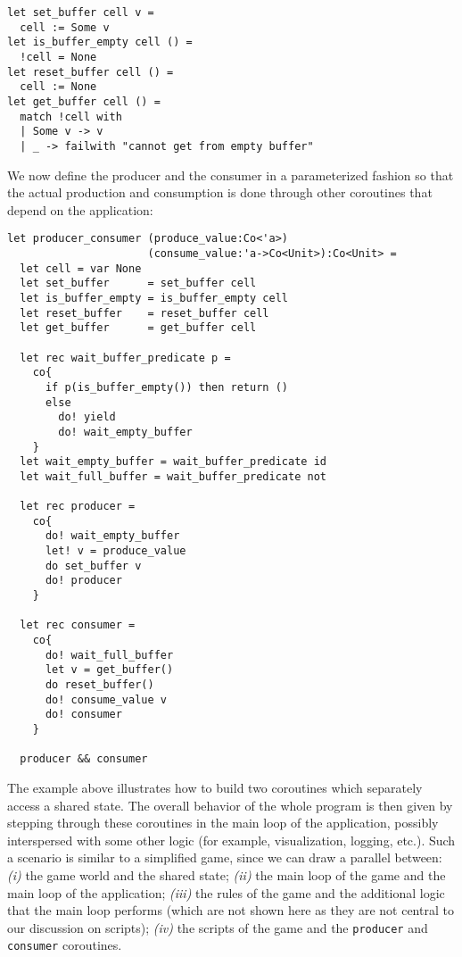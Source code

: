 \begin{lstlisting}
let set_buffer cell v =
  cell := Some v
let is_buffer_empty cell () = 
  !cell = None
let reset_buffer cell () =  
  cell := None
let get_buffer cell () =  
  match !cell with
  | Some v -> v
  | _ -> failwith "cannot get from empty buffer"
\end{lstlisting}

We now define the producer and the consumer in a parameterized fashion so that the actual production and consumption is done through other coroutines that depend on the application:

\begin{lstlisting}
let producer_consumer (produce_value:Co<'a>)
                      (consume_value:'a->Co<Unit>):Co<Unit> = 
  let cell = var None
  let set_buffer      = set_buffer cell
  let is_buffer_empty = is_buffer_empty cell
  let reset_buffer    = reset_buffer cell
  let get_buffer      = get_buffer cell
  
  let rec wait_buffer_predicate p = 
    co{
      if p(is_buffer_empty()) then return ()
      else  
        do! yield
        do! wait_empty_buffer
    }
  let wait_empty_buffer = wait_buffer_predicate id
  let wait_full_buffer = wait_buffer_predicate not
  
  let rec producer =
    co{
      do! wait_empty_buffer
      let! v = produce_value 
      do set_buffer v
      do! producer
    }

  let rec consumer =
    co{
      do! wait_full_buffer
      let v = get_buffer()
      do reset_buffer()
      do! consume_value v
      do! consumer
    }

  producer && consumer
\end{lstlisting}

The example above illustrates how to build two coroutines which separately access a shared state. The overall behavior of the whole program is then given by stepping through these coroutines in the main loop of the application, possibly interspersed with some other logic (for example, visualization, logging, etc.). Such a scenario is similar to a simplified game, since we can draw a parallel between: \textit{(i)} the game world and the shared state; \textit{(ii)} the main loop of the game and the main loop of the application; \textit{(iii)} the rules of the game and the additional logic that the main loop performs (which are not shown here as they are not central to our discussion on scripts); \textit{(iv)} the scripts of the game and the \texttt{producer} and \texttt{consumer} coroutines.

